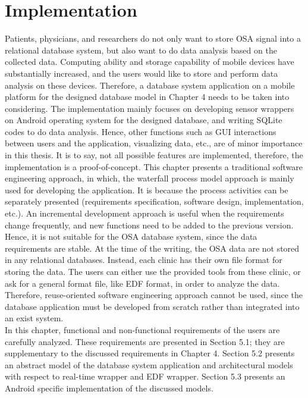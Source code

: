 
\chapter{Implementation} %

\label{Chapter5} %

Patients, physicians, and researchers do not only want to store OSA signal into a relational database system, but also want to do data analysis based on the collected data. Computing ability and storage capability of mobile devices have substantially increased, and the users would like to store and perform data analysis on these devices. Therefore, a database system application on a mobile platform for the designed database model in Chapter 4 needs to be taken into considering. The implementation mainly focuses on developing sensor wrappers on Android operating system for the designed database, and writing SQLite codes to do data analysis. Hence, other functions such as GUI interactions between users and the application, visualizing data, etc., are of minor importance in this thesis. It is to say, not all possible features are implemented, therefore, the implementation is a proof-of-concept. This chapter presents a traditional software engineering approach, in which, the waterfall process model approach is mainly used for developing the application. It is because the process activities can be separately presented (requirements specification, software design, implementation, etc.). An incremental development approach is useful when the requirements change frequently, and new functions need to be added to the previous version. Hence, it is not suitable for the OSA database system, since the data requirements are stable. At the time of the writing, the OSA data are not stored in any relational databases. Instead, each clinic has their own file format for storing the data. The users can either use the provided tools from these clinic, or ask for a general format file, like EDF format, in order to analyze the data. Therefore, reuse-oriented software engineering approach cannot be used, since the database application must be developed from scratch rather than integrated into an exist system.\\
In this chapter, functional and non-functional requirements of the users are carefully analyzed. These requirements are presented in Section 5.1; they are supplementary to the discussed requirements in Chapter 4. Section 5.2 presents an abstract model of the database system application and architectural models with respect to real-time wrapper and EDF wrapper. Section 5.3 presents an Android specific implementation of the discussed models.
